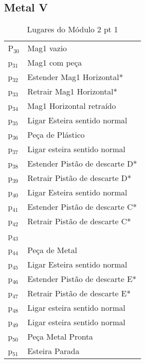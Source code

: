 \documentclass[11pt]{article}
\begin{document}
\subsection{Metal V}
\label{sec-1-2}

\begin{table}[htb]
\caption{Lugares do Módulo 2 pt 1}
\centering
\begin{tabular}{ll}
P$_{\text{30}}$ & Mag1 vazio\\
p$_{\text{31}}$ & Mag1 com peça\\
p$_{\text{32}}$ & Estender Mag1 Horizontal*\\
p$_{\text{33}}$ & Retrair Mag1 Horizontal*\\
p$_{\text{34}}$ & Mag1 Horizontal retraído\\
p$_{\text{35}}$ & Ligar Esteira sentido normal\\
p$_{\text{36}}$ & Peça de Plástico\\
p$_{\text{37}}$ & Ligar esteira sentido normal\\
p$_{\text{38}}$ & Estender Pistão de descarte D*\\
p$_{\text{39}}$ & Retrair Pistão de descarte D*\\
p$_{\text{40}}$ & Ligar Esteira sentido normal\\
p$_{\text{41}}$ & Estender Pistão de descarte C*\\
p$_{\text{42}}$ & Retrair Pistão de descarte C*\\
p$_{\text{43}}$ & \\
p$_{\text{44}}$ & Peça de Metal\\
p$_{\text{45}}$ & Ligar Esteira sentido normal\\
p$_{\text{46}}$ & Estender Pistão de descarte E*\\
p$_{\text{47}}$ & Retrair Pistão de descarte E*\\
p$_{\text{48}}$ & Ligar esteira sentido normal\\
p$_{\text{49}}$ & Ligar esteira sentido normal\\
p$_{\text{50}}$ & Peça Metal Pronta\\
p$_{\text{51}}$ & Esteira Parada\\
\end{tabular}
\end{table}
\end{document}
